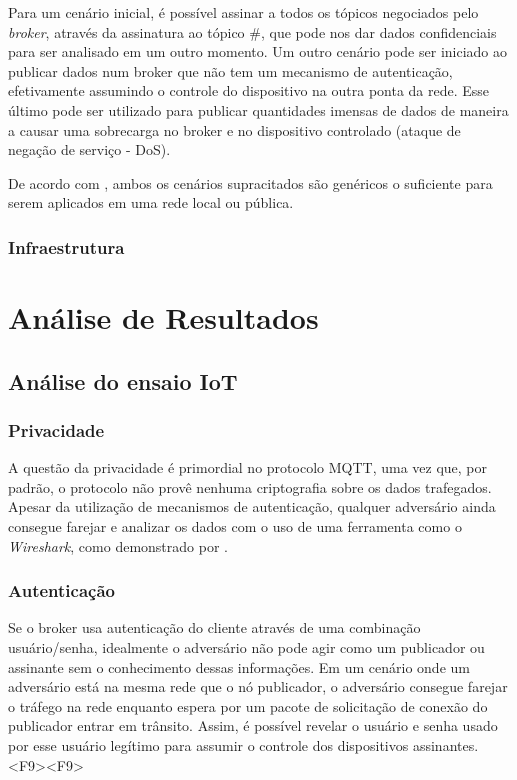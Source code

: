 \documentclass[tcc,capa]{texufpel}
\begin{document}
Para um cenário inicial, é possível assinar a todos os tópicos negociados pelo \textit{broker}, através da assinatura ao tópico $\#$, que pode nos dar dados confidenciais para ser
analisado em um outro momento. Um outro cenário pode ser iniciado ao publicar dados num broker que não tem um mecanismo de autenticação, efetivamente assumindo o controle do
dispositivo na outra ponta da rede. Esse último pode ser utilizado para publicar quantidades imensas de dados de maneira a causar uma sobrecarga no broker e no dispositivo
controlado (ataque de negação de serviço - DoS).

De acordo com \citet{attack2017}, ambos os cenários supracitados são genéricos o suficiente para serem aplicados em uma rede local ou pública.

\subsection{Infraestrutura}



\chapter{Análise de Resultados}


\section{Análise do ensaio IoT}
\subsection{Privacidade}
A questão da privacidade é primordial no protocolo MQTT, uma vez que, por padrão, o protocolo não provê nenhuma criptografia sobre os dados trafegados. Apesar da utilização de
mecanismos de autenticação, qualquer adversário ainda consegue farejar e analizar os dados com o uso de uma ferramenta como o \textit{Wireshark}, como demonstrado por
\citet{attack2017}.
\subsection{Autenticação}
Se o broker usa autenticação do cliente através de uma combinação usuário/senha, idealmente o adversário não pode agir como um publicador ou assinante sem o conhecimento dessas
informações. Em um cenário onde um adversário está na mesma rede que o nó publicador, o adversário consegue farejar o tráfego na rede enquanto espera por um pacote de solicitação
de conexão do publicador entrar em trânsito. Assim, é possível revelar o usuário e senha usado por esse usuário legítimo para assumir o controle dos dispositivos
assinantes.<F9><F9>
\end{document}
